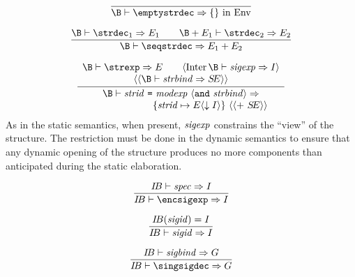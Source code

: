 \vspace{6pt}
\begin{equation}                %
\frac{}
     {\B\ts\emptystrdec\ra \emptymap{\rm\ in}\ \Env}
\end{equation}

\vspace{6pt}
\begin{equation}		%
\frac{ \B\ts\strdec_1\ra\E_1\qquad
       \B+\E_1\ts\strdec_2\ra\E_2 }
     { \B\ts\seqstrdec\ra\plusmap{\E_1}{\E_2} }
\end{equation}

\begin{equation}                %
\frac{ \begin{array}{cl}
       \B\ts\strexp\ra\E\qquad\langle\Inter\B\ts\sigexp\ra\I\rangle\\
       \langle\langle\B\ts\strbind\ra\SE\rangle\rangle
       \end{array}
     }
     {\begin{array}{c}
      \B\ts\strbinder\ra\\
      \qquad\qquad\qquad\{\strid\mapsto\E\langle\downarrow\I\rangle\}
      \ \langle\langle +\ \SE\rangle\rangle
      \end{array}
     }\index{61.1}
\end{equation}
\comment As in the static semantics, when present, ${\it sigexp}$ constrains the
``view'' of the structure. The restriction must be done in the
dynamic semantics to ensure that any dynamic opening of the structure
produces no more components than anticipated during the static
elaboration.
%
%

\begin{equation}		%
\frac{\IB\ts\spec\ra\I }
     {\IB\ts\encsigexp\ra\I}\index{61.2}
\end{equation}

\begin{equation}		%
\frac{ \IB(\sigid)=\I}
     { \IB\ts\sigid\ra\I }
\end{equation}

\begin{equation}	%
\frac{ \IB\ts\sigbind\ra\G }
     { \IB\ts\singsigdec\ra\G }\index{61.3}
\end{equation}

